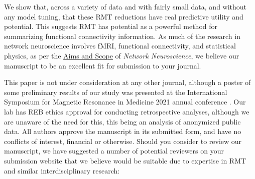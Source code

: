 \documentclass{article}
\begin{document}
We show that, across a variety of data and with fairly small data, and without any model tuning,
that these RMT reductions have real predictive utility and potential. This suggests RMT has
potential as a powerful method for summarizing functional connectivity information. As much of the
research in network neuroscience involves fMRI, functional connectivity, and statistical physics, as
per the \href{https://direct.mit.edu/netn/pages/submission-guidelines#aims}{Aims and Scope} of \emph{Network
Neuroscience}, we believe our manuscript to be an excellent fit for submission to your journal.

This paper is not under consideration at any other journal, although a poster of some preliminary
results of our study was presented at the International Symposium for Magnetic Resonance in Medicine
2021 annual conference \citep{bergerOpenSourceRandom2021}. Our lab has REB ethics approval for
conducting retrospective analyses, although we are unaware of the need for this, this being an
analysis of anonymized public data. All authors approve the manuscript in its submitted form, and
have no conflicts of interest, financial or otherwise. Should you consider to review our manuscript,
we have suggested a number of potential reviewers on your submission website that we believe would
be suitable due to expertise in RMT and similar interdisciplinary research:


\end{document}
